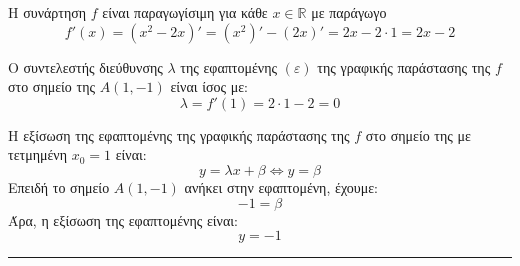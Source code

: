 \begin{alist}
\item Η συνάρτηση $f$ είναι παραγωγίσιμη για κάθε $x \in \mathbb{R}$ με παράγωγο
\[ f'(x) = (x^2 - 2x)' = (x^2)' - (2x)' = 2x - 2 \cdot 1 = 2x - 2 \]

\item Ο συντελεστής διεύθυνσης $\lambda$ της εφαπτομένης $(\varepsilon)$ της γραφικής παράστασης της $f$ στο σημείο της $A(1, -1)$ είναι ίσος με:
\[ \lambda = f'(1) = 2 \cdot 1 - 2 = 0 \]

\item Η εξίσωση της εφαπτομένης της γραφικής παράστασης της $f$ στο σημείο της με τετμημένη $x_0 = 1$ είναι:
\[ y = \lambda x + \beta \Leftrightarrow y = \beta \]
Επειδή το σημείο $A(1, -1)$ ανήκει στην εφαπτομένη, έχουμε:
\[ -1 = \beta \]
Άρα, η εξίσωση της εφαπτομένης είναι:
\[ y = -1 \]
\end{alist}
\vspace{6mm}
\noindent\rule{\textwidth}{0.4pt}
\vspace{6mm}

